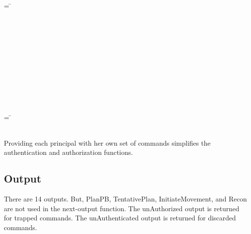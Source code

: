 \documentclass[../../main/main.tex]{subfiles}
\begin{document}
\begin{tabbing}
\parskip=8pt
 = \= \\
					     \>\HOLTokenBar{}  \\
					     \>\HOLTokenBar{}  \\
					     \>\HOLTokenBar{} \\
          				     \>\HOLTokenBar{}  \\
				     	     \>\HOLTokenBar{}  \\
					     \>\HOLTokenBar{}  \\
					     \>\HOLTokenBar{}  \\
					     \>\HOLTokenBar{} \\
          				     \>\HOLTokenBar{}  \\
				     	     \>\HOLTokenBar{}  \\
					     \>\HOLTokenBar{} 
\parskip=18pt
\end{tabbing}

\begin{tabbing}
\parskip=8pt
 = \= \\
						\>\HOLTokenBar{} \\
           					\>\HOLTokenBar{} 
\parskip=18pt
\end{tabbing}

Providing each principal with her own set of commands simplifies the authentication and authorization functions.
\subsection{Output}
There are 14 outputs.  But, PlanPB, TentativePlan, InitiateMovement, and Recon are not used in the next-output function.  The unAuthorized output is returned for trapped commands.  The unAuthenticated output is returned for discarded commands.
\end{document}
